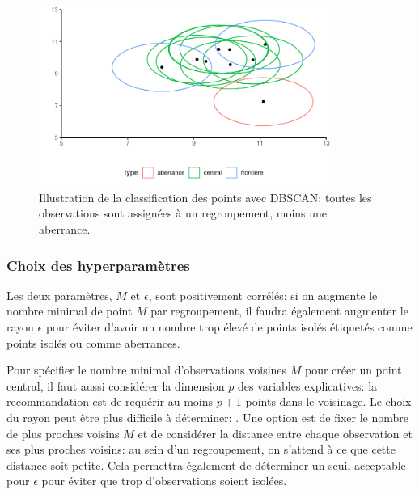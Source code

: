 \documentclass[
  11pt,
  letterpaper,
]{scrbook}
\theoremstyle{definition}
\theoremstyle{remark}
\begin{document}
\begin{figure}[ht!]

{\centering \includegraphics[width=0.85\textwidth,height=\textheight]{regroupements_files/figure-pdf/fig-dbscan1-1.pdf}

}

\caption{\label{fig-dbscan1}Illustration de la classification des points
avec DBSCAN: toutes les observations sont assignées à un regroupement,
moins une aberrance.}

\end{figure}

\hypertarget{choix-des-hyperparamuxe8tres-1}{%
\subsubsection{Choix des
hyperparamètres}\label{choix-des-hyperparamuxe8tres-1}}

Les deux paramètres, \(M\) et \(\epsilon\), sont positivement corrélés:
si on augmente le nombre minimal de point \(M\) par regroupement, il
faudra également augmenter le rayon \(\epsilon\) pour éviter d'avoir un
nombre trop élevé de points isolés étiquetés comme points isolés ou
comme aberrances.

Pour spécifier le nombre minimal d'observations voisines \(M\) pour
créer un point central, il faut aussi considérer la dimension \(p\) des
variables explicatives: la recommandation est de requérir au moins
\(p+1\) points dans le voisinage. Le choix du rayon peut être plus
difficile à déterminer: . Une option est de fixer le nombre de plus
proches voisins \(M\) et de considérer la distance entre chaque
observation et ses plus proches voisins: au sein d'un regroupement, on
s'attend à ce que cette distance soit petite. Cela permettra également
de déterminer un seuil acceptable pour \(\epsilon\) pour éviter que trop
d'observations soient isolées.
\end{document}
